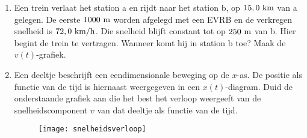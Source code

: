 \begin{enumerate}
\item Een trein verlaat het station a en rijdt
naar het station b, op $15,0~\rm km$ van a gelegen. De eerste
$1000~\rm m$ worden afgelegd met een EVRB en de verkregen snelheid
is $72,0~\rm km/h$. Die snelheid blijft constant tot op $250~\rm m$
van b. Hier begint de trein te vertragen. Wanneer komt hij in
station b toe? Maak de $v(t)$-grafiek.










\item 
\begin{minipage}[t]{0.5\textwidth}
Een deeltje beschrijft een eendimensionale beweging op de $x$-as. De positie als functie van de tijd is hiernaast weergegeven in een $x(t)$-diagram. Duid de onderstaande grafiek aan die het best het verloop weergeeft van de snelheidscomponent $v$ van dat deeltje als functie van de tijd. 
\end{minipage}
\hspace{0.1\textwidth}
\begin{minipage}[t]{0.3\textwidth}
\end{minipage}
\begin{figure}[h]
\begin{flushright}
\texttt{[image: snelheidsverloop]}
\end{flushright}
\end{figure}


\end{enumerate}
